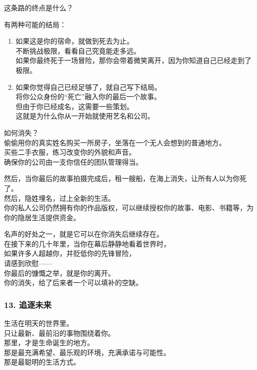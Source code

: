 \documentclass[
]{article}
\begin{document}
这条路的终点是什么？

有两种可能的结局：

\begin{enumerate}
\def\labelenumi{\arabic{enumi}.}
\item
  如果这是你的宿命，就做到死去为止。\\
  不断挑战极限，看看自己究竟能走多远。\\
  如果你最终死于一场冒险，那你会带着微笑离开，因为你知道自己已经走到了极限。
\item
  如果你觉得自己已经足够了，就自己写下结局。\\
  将你公众身份的``死亡''融入你的最后一个故事。\\
  但由于你已经成名，这需要一些策划。\\
  这就是为什么你从一开始就使用艺名和公司。
\end{enumerate}

如何消失？\\
偷偷用你的真实姓名购买一所房子，坐落在一个无人会想到的普通地方。\\
买些二手衣服，练习改变你的外貌和声音。\\
确保你的公司由一支你信任的团队管理得当。

然后，当你最后的故事拍摄完成后，租一艘船，在海上消失，让所有人以为你死了。\\
然后，隐姓埋名，过上全新的生活。\\
你的私人公司仍然拥有你的作品版权，可以继续授权你的故事、电影、书籍等，为你的隐居生活提供资金。

名声的好处之一，就是它可以在你消失后继续存在。\\
在接下来的几十年里，当你在幕后静静地看着世界时，\\
如果许多人超越你，并贬低你的先锋冒险，\\
请感到欣慰------\\
你最后的慷慨之举，就是你的离开。\\
你的消失，给了后来者一个可以填补的空缺。

\subsubsection{13. 追逐未来}\label{13-ux8ffdux9010ux672aux6765}

生活在明天的世界里。\\
只让最新、最前沿的事物围绕着你。\\
那里，才是生命诞生的地方。\\
那是最充满希望、最乐观的环境，充满承诺与可能性。\\
那是最聪明的生活方式。
\end{document}
